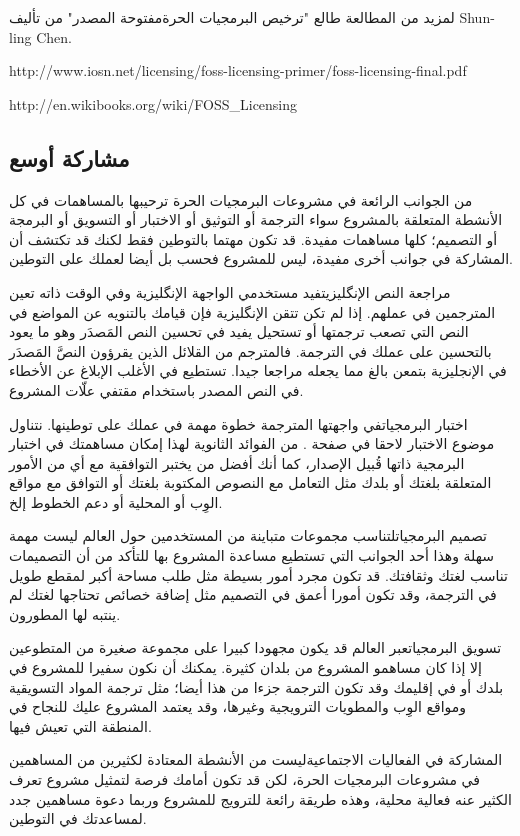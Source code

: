 لمزيد من المطالعة طالع "ترخيص البرمجيات الحرة مفتوحة
المصدر" من تأليف Shun-ling Chen.

http://www.iosn.net/licensing/foss-licensing-primer/foss-licensing-final.pdf

http://en.wikibooks.org/wiki/FOSS\_Licensing

\subsection{مشاركة أوسع}
من الجوانب الرائعة في مشروعات البرمجيات الحرة ترحيبها بالمساهمات في كل
الأنشطة المتعلقة بالمشروع سواء الترجمة أو التوثيق أو الاختبار أو
التسويق أو البرمجة أو التصميم؛ كلها مساهمات مفيدة. قد تكون مهتما
بالتوطين فقط لكنك قد تكتشف أن المشاركة في جوانب أخرى مفيدة، ليس للمشروع
فحسب بل أيضا لعملك على التوطين.

مراجعة النص الإنگليزي{\md  تفيد مستخدمي الواجهة الإنگليزية وفي الوقت
ذاته تعين المترجمين في عملهم. إذا لم تكن تتقن الإنگليزية فإن قيامك
بالتنويه عن المواضع في النص التي تصعب ترجمتها أو تستحيل يفيد في تحسين
النص المَصدَر وهو ما يعود بالتحسين على عملك في الترجمة. فالمترجم من
القلائل الذين يقرؤون النصَّ المَصدَر في الإنجليزية بتمعن بالغ مما يجعله
مراجعا جيدا. تستطيع في الأغلب الإبلاغ عن الأخطاء في النص المصدر
باستخدام مقتفي علّات المشروع.}

اختبار البرمجيات{\md  في واجهتها المترجمة خطوة مهمة في عملك على توطينها.
نتناول موضوع الاختبار لاحقا في صفحة }{\md
{}}{\md . من الفوائد الثانوية لهذا إمكان
مساهمتك في اختبار البرمجية ذاتها قُبيل الإصدار، كما أنك أفضل من يختبر
التوافقية مع أي من الأمور المتعلقة بلغتك أو بلدك مثل التعامل مع النصوص
المكتوبة بلغتك أو التوافق مع مواقع الوِب أو المحلية أو دعم الخطوط إلخ.}

تصميم البرمجيات{\md  لتناسب مجموعات متباينة من المستخدمين حول العالم
ليست مهمة سهلة وهذا أحد الجوانب التي تستطيع مساعدة المشروع بها للتأكد
من أن التصميمات تناسب لغتك وثقافتك. قد تكون مجرد أمور بسيطة مثل طلب
مساحة أكبر لمقطع طويل في الترجمة، وقد تكون أمورا أعمق في التصميم مثل
إضافة خصائص تحتاجها لغتك لم ينتبه لها المطورون.}

تسويق البرمجيات{\md  عبر العالم قد يكون مجهودا كبيرا على مجموعة صغيرة من
المتطوعين إلا إذا كان مساهمو المشروع من بلدان كثيرة. يمكنك أن نكون
سفيرا للمشروع في بلدك أو في إقليمك وقد تكون الترجمة جزءا من هذا أيضا؛
مثل ترجمة المواد التسويقية ومواقع الوِب والمطويات }{\md الترويجية
وغيرها، وقد يعتمد المشروع عليك للنجاح في المنطقة التي تعيش فيها.}

المشاركة في الفعاليات الاجتماعية{\md  ليست من الأنشطة المعتادة لكثيرين
من المساهمين في مشروعات البرمجيات الحرة، لكن قد تكون أمامك فرصة لتمثيل
مشروع تعرف الكثير عنه فعالية محلية، وهذه طريقة رائعة للترويج للمشروع
وربما دعوة مساهمين جدد لمساعدتك في التوطين.}

